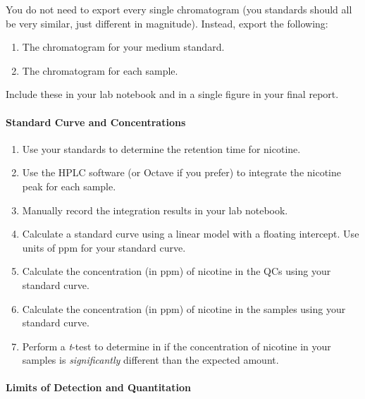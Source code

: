 \documentclass[]{tufte-book}
\providecommand{\tightlist}{%
  \setlength{\itemsep}{0pt}\setlength{\parskip}{0pt}}
\begin{document}
You do not need to export every single chromatogram (you standards should all be very similar, just different in magnitude). Instead, export the following:

\begin{enumerate}
\def\labelenumi{\arabic{enumi}.}
\tightlist
\item
  The chromatogram for your medium standard.
\item
  The chromatogram for each sample.
\end{enumerate}

Include these in your lab notebook and in a single figure in your final report.

\hypertarget{standard-curve-and-concentrations}{%
\paragraph{\texorpdfstring{\textbf{Standard Curve and Concentrations}}{Standard Curve and Concentrations}}\label{standard-curve-and-concentrations}}

\begin{enumerate}
\def\labelenumi{\arabic{enumi}.}
\tightlist
\item
  Use your standards to determine the retention time for nicotine.
\item
  Use the HPLC software (or Octave if you prefer) to integrate the nicotine peak for each sample.
\item
  Manually record the integration results in your lab notebook.
\item
  Calculate a standard curve using a linear model with a floating intercept. Use units of ppm for your standard curve.
\item
  Calculate the concentration (in ppm) of nicotine in the QCs using your standard curve.
\item
  Calculate the concentration (in ppm) of nicotine in the samples using your standard curve.
\item
  Perform a \emph{t}-test to determine in if the concentration of nicotine in your samples is \emph{significantly} different than the expected amount.
\end{enumerate}

\hypertarget{limits-of-detection-and-quantitation}{%
\paragraph{\texorpdfstring{\textbf{Limits of Detection and Quantitation}}{Limits of Detection and Quantitation}}\label{limits-of-detection-and-quantitation}}
\end{document}

